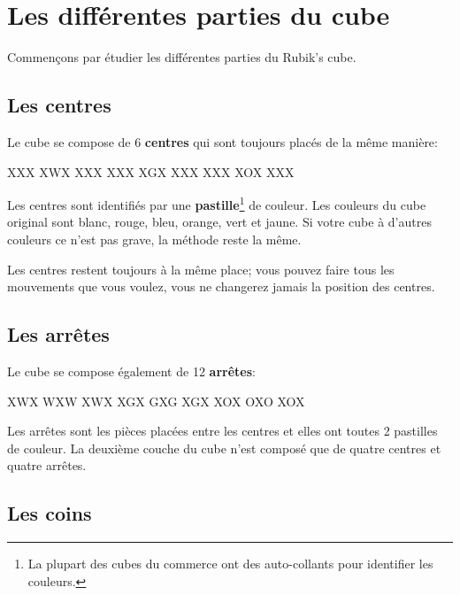 \chapter{Les différentes parties du cube}

Commençons par étudier les différentes parties du Rubik's cube.

\section{Les centres}

Le cube se compose de 6 \textbf{centres} qui sont toujours placés de la même manière:

\begin{center}
	\RubikFaceUp%
	{X}{X}{X}%
	{X}{W}{X}%
	{X}{X}{X}
	\RubikFaceRight%
	{X}{X}{X}%
	{X}{G}{X}%
	{X}{X}{X}
	\RubikFaceFront%
	{X}{X}{X}%
	{X}{O}{X}%
	{X}{X}{X}
\end{center}

Les centres sont identifiés par une \textbf{pastille}\footnote{La plupart des cubes du commerce ont des auto-collants pour identifier les couleurs.} de couleur. Les
couleurs du cube original sont blanc, rouge, bleu, orange, vert et jaune.
Si votre cube à d'autres couleurs ce n'est pas grave, la méthode reste la
même.

Les centres restent toujours à la même place; vous pouvez faire tous les mouvements que vous voulez, vous ne changerez jamais la position des centres.

\section{Les arrêtes}
\begin{samepage}
Le cube se compose également de 12 \textbf{arrêtes}:

\begin{center}
	\RubikFaceUp%
	{X}{W}{X}%
	{W}{X}{W}%
	{X}{W}{X}
	\RubikFaceRight%
	{X}{G}{X}%
	{G}{X}{G}%
	{X}{G}{X}
	\RubikFaceFront%
	{X}{O}{X}%
	{O}{X}{O}%
	{X}{O}{X}
\end{center}
\end{samepage}

Les arrêtes sont les pièces placées entre les centres et elles ont toutes 2 pastilles de couleur. La deuxième couche du cube n'est composé que de quatre  centres et  quatre arrêtes.

\section{Les coins}

